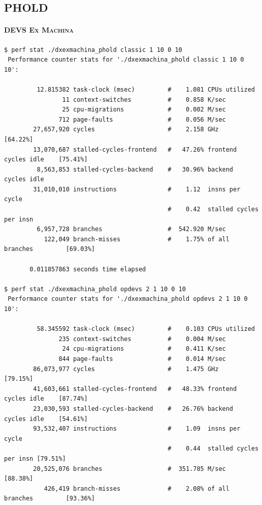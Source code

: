 \documentclass[8pt,a4paper]{report}
\begin{document}
\subsection{PHOLD}
\paragraph{\textsc{DEVS Ex Machina}}
\begin{Verbatim}[fontsize=\small]
$ perf stat ./dxexmachina_phold classic 1 10 0 10
 Performance counter stats for './dxexmachina_phold classic 1 10 0 10':

         12.815382 task-clock (msec)         #    1.081 CPUs utilized          
                11 context-switches          #    0.858 K/sec                  
                25 cpu-migrations            #    0.002 M/sec                  
               712 page-faults               #    0.056 M/sec                  
        27,657,920 cycles                    #    2.158 GHz                     [64.22%]
        13,070,687 stalled-cycles-frontend   #   47.26% frontend cycles idle    [75.41%]
         8,563,853 stalled-cycles-backend    #   30.96% backend  cycles idle   
        31,010,010 instructions              #    1.12  insns per cycle        
                                             #    0.42  stalled cycles per insn
         6,957,728 branches                  #  542.920 M/sec                  
           122,049 branch-misses             #    1.75% of all branches         [69.03%]

       0.011857863 seconds time elapsed
       
$ perf stat ./dxexmachina_phold opdevs 2 1 10 0 10
 Performance counter stats for './dxexmachina_phold opdevs 2 1 10 0 10':

         58.345592 task-clock (msec)         #    0.103 CPUs utilized          
               235 context-switches          #    0.004 M/sec                  
                24 cpu-migrations            #    0.411 K/sec                  
               844 page-faults               #    0.014 M/sec                  
        86,073,977 cycles                    #    1.475 GHz                     [79.15%]
        41,603,661 stalled-cycles-frontend   #   48.33% frontend cycles idle    [87.74%]
        23,030,593 stalled-cycles-backend    #   26.76% backend  cycles idle    [54.61%]
        93,532,407 instructions              #    1.09  insns per cycle        
                                             #    0.44  stalled cycles per insn [79.51%]
        20,525,076 branches                  #  351.785 M/sec                   [88.38%]
           426,419 branch-misses             #    2.08% of all branches         [93.36%]


\end{Verbatim}
\end{document}
